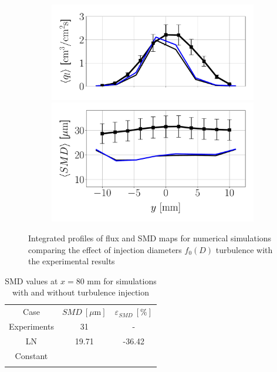 \begin{figure}[h!]
\begin{subfigure}[b]{0.4\textwidth}
	\flushleft
   \includegraphics[scale=0.35]{./part2_developments/figures_ch6_lagrangian_JICF/params_f0/profiles/flux_along_y}\\
   \vspace{-0.16in}
   \includegraphics[scale=0.35]{./part2_developments/figures_ch6_lagrangian_JICF/params_f0/profiles/SMD_along_y}
\end{subfigure}

\caption{Integrated profiles of flux and SMD maps for numerical simulations comparing the effect of injection diameters $f_0 \left( D \right)$ turbulence with the experimental results}
\label{fig:profiles_LGS_JICF_f0}
\end{figure}

\begin{table}[!h]
\centering
\caption{SMD values at $x = 80$ mm for simulations with and without turbulence injection}
\begin{tabular}{ccc}
\thickhline
Case & $SMD~\left[\mu \mathrm{m} \right]$ & $\varepsilon_{SMD}~\left[\% \right]$ \\
\thickhline
Experiments & 31 & - \\
LN & 19.71 & -36.42 \\
Constant & & \\
\thickhline
\end{tabular}
\label{tab:SMD_deviations_f0}
\end{table}


